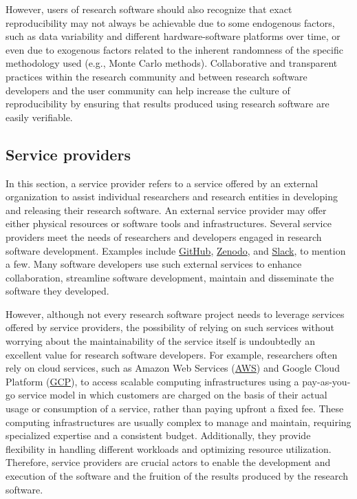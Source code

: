 However, users of research software should also recognize that exact reproducibility may not always be achievable due to some endogenous factors, such as data variability and different hardware-software platforms over time, or even due to exogenous factors related to the inherent randomness of the specific methodology used (e.g., Monte Carlo methods). 
Collaborative and transparent practices within the research community and between research software developers and the user community can help increase the culture of reproducibility by ensuring that results produced using research software are easily verifiable.


\subsection{Service providers}


In this section, a service provider refers to a service offered by an external organization to assist individual researchers and research entities in developing and releasing their research software. 
An external service provider may offer either physical resources or software tools and infrastructures.  
Several service providers meet the needs of researchers and developers engaged in research software development. Examples include \href{https://github.com}{GitHub}, \href{https://zenodo.org/}{Zenodo}, and \href{https://slack.com}{Slack}, to mention a few. Many software developers use such external services to enhance collaboration, streamline software development, maintain and disseminate the software they developed. 

However, although not every research software project needs to leverage services offered by service providers, the possibility of relying on such services without worrying about the maintainability of the service itself is undoubtedly an excellent value for research software developers.  
For example, researchers often rely on cloud services, such as Amazon Web Services (\href{https://aws.amazon.com/}{AWS}) and Google Cloud Platform (\href{https://cloud.google.com/}{GCP}), to access scalable computing infrastructures using a pay-as-you-go service model in which customers are charged on the basis of their actual usage or consumption of a service, rather than paying upfront a fixed fee.
These computing infrastructures are usually complex to manage and maintain, requiring specialized expertise and a consistent budget. Additionally, they provide flexibility in handling different workloads and optimizing resource utilization. 
Therefore, service providers are crucial actors to enable the development and execution of the software and the fruition of the results produced by the research software.

